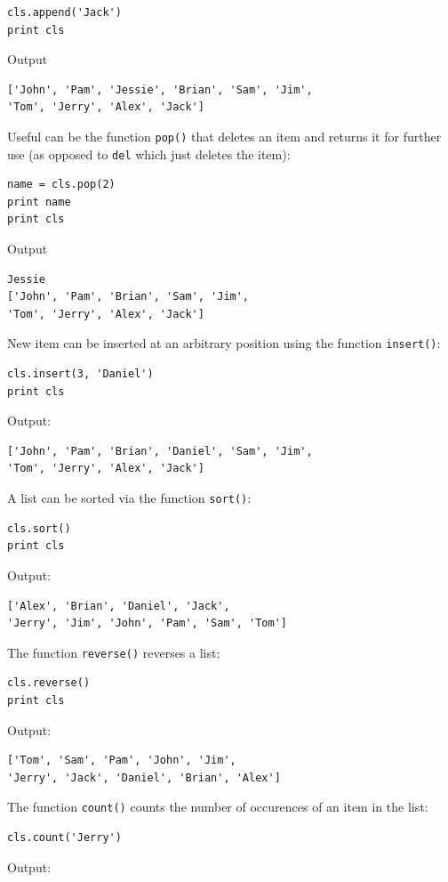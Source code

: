 \begin{verbatim}
cls.append('Jack')
print cls
\end{verbatim}
Output

\begin{verbatim}
['John', 'Pam', 'Jessie', 'Brian', 'Sam', 'Jim', 
'Tom', 'Jerry', 'Alex', 'Jack']
\end{verbatim}
Useful can be the function {\tt pop()} that deletes an item and returns it for further
use (as opposed to {\tt del} which just deletes the item):

\begin{verbatim}
name = cls.pop(2)
print name 
print cls
\end{verbatim}
Output

\begin{verbatim}
Jessie
['John', 'Pam', 'Brian', 'Sam', 'Jim', 
'Tom', 'Jerry', 'Alex', 'Jack']
\end{verbatim}
New item can be inserted at an arbitrary position using the function {\tt insert()}:

\begin{verbatim}
cls.insert(3, 'Daniel')
print cls
\end{verbatim}
Output:

\begin{verbatim}
['John', 'Pam', 'Brian', 'Daniel', 'Sam', 'Jim', 
'Tom', 'Jerry', 'Alex', 'Jack']
\end{verbatim}
A list can be sorted via the function {\tt sort()}:

\begin{verbatim}
cls.sort()
print cls
\end{verbatim}
Output:

\begin{verbatim}
['Alex', 'Brian', 'Daniel', 'Jack', 
'Jerry', 'Jim', 'John', 'Pam', 'Sam', 'Tom']
\end{verbatim}
The function {\tt reverse()} reverses a list:

\begin{verbatim}
cls.reverse()
print cls
\end{verbatim}
Output:

\begin{verbatim}
['Tom', 'Sam', 'Pam', 'John', 'Jim', 
'Jerry', 'Jack', 'Daniel', 'Brian', 'Alex']
\end{verbatim}
The function {\tt count()} counts the number of occurences of an item
in the list:

\begin{verbatim}
cls.count('Jerry')
\end{verbatim}
Output:

